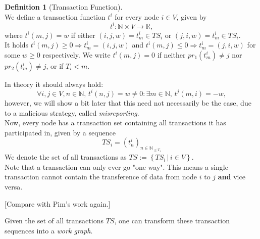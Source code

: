 \documentclass[11pt,a4paper]{article}
\theoremstyle{definition}
\newtheorem{definition}{Definition}[section]
\theoremstyle{theorem}
\theoremstyle{proposition}
\theoremstyle{corollary}
\theoremstyle{lemma}
\theoremstyle{example}
\theoremstyle{remark}
\begin{document}
\begin{definition}[Transaction Function]\ \\
\noindent{}We define a transaction function $t^i$ for every node $i\in{}V$, given by 
\[
t^i:\mathbb{N}\times{}V\rightarrow{}\mathbb{R},
\]
\noindent{}where $t^i(m,j)=w$ if either $(i,j,w)=t_m^i\in{}TS_i$ or $(j,i,w)=t_m^i\in{}TS_i$. \vspace{1em}\\ 
\noindent{}It holds $t^i(m,j)\geq{}0\Rightarrow t^i_m=(i,j,w)$ and $t^i(m,j)\leq{}0\Rightarrow t^i_m=(j,i,w)$ for some $w\geq{}0$ respectively. We write $t^i(m,j)=0$ if neither $pr_1(t^i_m)\neq{}j$ nor $pr_2(t^i_m)\neq{}j$, or if $T_i<m$.\vspace{1em}\\
\end{definition}

\noindent{}In theory it should always hold:
\[
\forall{}i,j\in{}V,n\in\mathbb{N},\,t^i(n,j)=w\neq{}0:\exists{}m\in\mathbb{N},\,t^j(m,i)=-w,
\]
\noindent{}however, we will show a bit later that this need not necessarily be the case, due to a malicious strategy, called {\it misreporting}. \vspace{1em}\\
\noindent{}Now, every node has a transaction set containing all transactions it has participated in, given by a sequence
\[
TS_i=\left(t^i_n\right)_{n\in\mathbb{N}_{\leq{}T_i}}
\] 
We denote the set of all transactions as $TS:=\left\lbrace{}TS_i\,|\,i\in{}V\right\rbrace.$ \vspace{1em}\\ %

\noindent{}Note that a transaction can only ever go "one way". This means a single transaction cannot contain the transference of data from node $i$ to $j$ {\bf and} vice versa. \vspace{1em}\\

\noindent{}\begin{center}[Compare with Pim's work again.] \vspace{1em}\\ \end{center}

\noindent{}Given the set of all transactions $TS$, one can transform these transaction sequences into a {\it work graph}. \vspace{1em}\\
\end{document}
